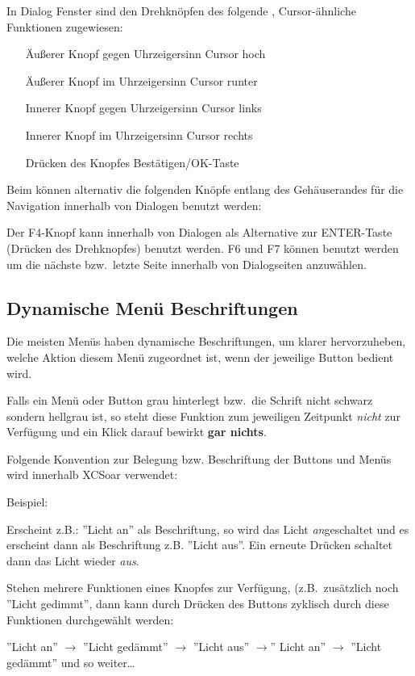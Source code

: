 In Dialog Fenster sind den Drehknöpfen des \al folgende , Cursor-ähnliche Funktionen zugewiesen:
\begin{itemize}
\item[Äußerer Knopf gegen Uhrzeigersinn       ] Cursor hoch
\item[Äußerer Knopf im Uhrzeigersinn             ] Cursor runter
\item[Innerer Knopf gegen Uhrzeigersinn        ] Cursor links
\item[Innerer Knopf im Uhrzeigersinn              ] Cursor rechts
\item[Drücken des Knopfes ] Bestätigen/OK-Taste
\end{itemize}

Beim \al können alternativ die folgenden Knöpfe entlang des Gehäuserandes für die Navigation innerhalb von Dialogen benutzt werden:

Der F4-Knopf kann innerhalb von Dialogen als Alternative zur ENTER-Taste (Drücken des Drehknopfes) benutzt werden.
F6 und F7 können benutzt werden um die nächste bzw.\ letzte Seite innerhalb von Dialogseiten anzuwählen.
\subsection*{Dynamische Menü Beschriftungen}
Die meisten Menüs haben dynamische Beschriftungen, um klarer hervorzuheben, welche Aktion diesem Menü zugeordnet ist, wenn der jeweilige Button bedient wird.

Falls ein Menü oder Button grau hinterlegt bzw.\ die Schrift nicht schwarz sondern hellgrau ist, \textcolor{white}{} so steht diese Funktion zum jeweiligen Zeitpunkt \emph{nicht} zur Verfügung und ein Klick darauf bewirkt \textbf{gar nichts}. 

Folgende Konvention zur Belegung bzw. Beschriftung der Buttons und Menüs wird  innerhalb \textsf{XCSoar} verwendet:

Beispiel:

Erscheint z.B.:  ''Licht an'' als Beschriftung, so  wird das Licht \emph{an}geschaltet und  es erscheint dann als Beschriftung z.B. ''Licht aus''.  Ein erneute Drücken schaltet dann das Licht wieder \emph{aus}.

Stehen mehrere Funktionen eines Knopfes zur Verfügung, (z.B.\ zusätzlich noch ''Licht gedimmt'', dann kann durch Drücken des Buttons zyklisch durch diese Funktionen durchgewählt werden:


\begin{center}
''Licht an'' $\rightarrow$ ''Licht gedämmt'' $\rightarrow$ ''Licht aus'' $\rightarrow$'' Licht an'' $\rightarrow$ ''Licht gedämmt'' und so weiter\dots
\end{center}

